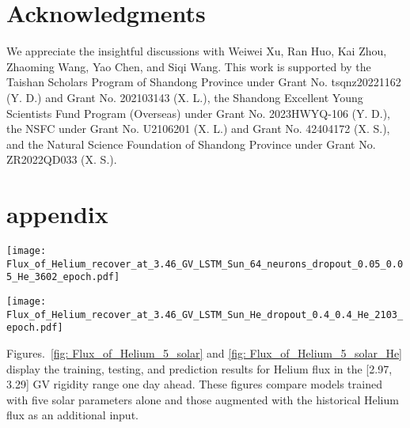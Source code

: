 \documentclass[twocolumn,,12pt]{aastex631}
\begin{document}
\section*{Acknowledgments}
We appreciate the insightful discussions with Weiwei Xu, Ran Huo, Kai Zhou, Zhaoming Wang, Yao Chen, and Siqi Wang. This work is supported by the Taishan Scholars Program of Shandong Province under Grant No. tsqnz20221162 (Y. D.) and Grant No. 202103143 (X. L.), the Shandong Excellent Young Scientists Fund Program (Overseas) under Grant No. 2023HWYQ-106 (Y. D.), the NSFC under Grant No. U2106201 (X. L.) and Grant No. 42404172 (X. S.), and the Natural Science Foundation of Shandong Province under Grant No. ZR2022QD033 (X. S.). 

\section*{appendix}
\begin{figure*}[tbh!]
\centering
\texttt{[image: Flux\_of\_Helium\_recover\_at\_3.46\_GV\_LSTM\_Sun\_64\_neurons\_dropout\_0.05\_0.05\_He\_3602\_epoch.pdf]}
\caption{Training, testing, and prediction results of Helium flux at [2.97, 3.29] GV one day ahead with five solar parameters of the past year as input. The green (yellow) dashed curve depicts the training (testing) data from AMS measurements while the blue (red) dashed curve depicts the prediction of the LSTM neural network for the training (testing) data. The chocolate dashed curve depicts the prediction of the LSTM neural network for the near future.}
\label{fig: Flux_of_Helium_5_solar} 
\end{figure*}

\begin{figure*}[tbh!]
\centering
\texttt{[image: Flux\_of\_Helium\_recover\_at\_3.46\_GV\_LSTM\_Sun\_He\_dropout\_0.4\_0.4\_He\_2103\_epoch.pdf]}
\caption{Training, testing, and prediction results of Helium flux at [2.97, 3.29] GV one day ahead with five solar parameters and Helium flux at [2.97, 3.29] GV of the past year as input. The green (yellow) dashed curve depicts the training (testing) data from AMS measurements while the blue (red) dashed curve depicts the prediction of the LSTM neural network for the training (testing) data. The chocolate dashed curve depicts the prediction of the LSTM neural network for the near future.}
\label{fig: Flux_of_Helium_5_solar_He} 
\end{figure*}

Figures.~\ref{fig: Flux_of_Helium_5_solar} and \ref{fig: Flux_of_Helium_5_solar_He} display the training, testing, and prediction results for Helium flux in the [2.97, 3.29] GV rigidity range one day ahead. These figures compare models trained with five solar parameters alone and those augmented with the historical Helium flux as an additional input.
\end{document}
